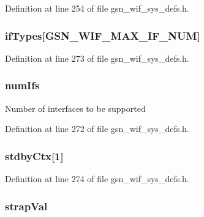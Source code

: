 Definition at line 254 of file gsn\_\-wif\_\-sys\_\-defs.h.

\hypertarget{a00348_a9cbf66db07b0b8d7e92f702d2e6896a8}{
\subsubsection[{ifTypes}]{ {\bf ifTypes}\mbox{[}GSN\_\-WIF\_\-MAX\_\-IF\_\-NUM\mbox{]}}}
\label{a00348_a9cbf66db07b0b8d7e92f702d2e6896a8}


Definition at line 273 of file gsn\_\-wif\_\-sys\_\-defs.h.

\hypertarget{a00348_a5d8ffa77e8421c84687b597a75ed84e7}{
\subsubsection[{numIfs}]{ {\bf numIfs}}}
\label{a00348_a5d8ffa77e8421c84687b597a75ed84e7}
Number of interfaces to be supported 

Definition at line 272 of file gsn\_\-wif\_\-sys\_\-defs.h.

\hypertarget{a00348_a040b2a18b45a5cfec1663e48692e1167}{
\subsubsection[{stdbyCtx}]{ {\bf stdbyCtx}\mbox{[}1\mbox{]}}}
\label{a00348_a040b2a18b45a5cfec1663e48692e1167}


Definition at line 274 of file gsn\_\-wif\_\-sys\_\-defs.h.

\hypertarget{a00348_a325947d5876bcd21082a678746f5810c}{
\subsubsection[{strapVal}]{ {\bf strapVal}}}
\label{a00348_a325947d5876bcd21082a678746f5810c}


